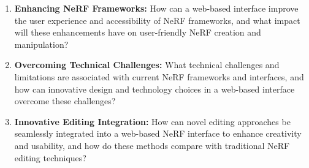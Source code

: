 \begin{enumerate}
    \item \textbf{Enhancing NeRF Frameworks:} How can a web-based interface improve the user experience and accessibility of NeRF frameworks, and what impact will these enhancements have on user-friendly NeRF creation and manipulation?

    \item \textbf{Overcoming Technical Challenges:} What technical challenges and limitations are associated with current NeRF frameworks and interfaces, and how can innovative design and technology choices in a web-based interface overcome these challenges?

    \item \textbf{Innovative Editing Integration:} How can novel editing approaches be seamlessly integrated into a web-based NeRF interface to enhance creativity and usability, and how do these methods compare with traditional NeRF editing techniques?
\end{enumerate}






